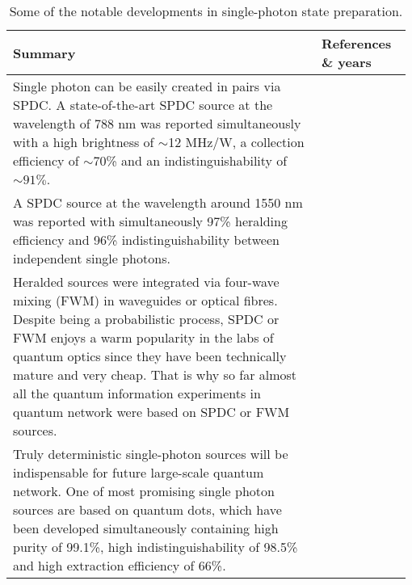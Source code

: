 \begin{table*}[!htbp]
	\begin{tabular}{|p{0.755\linewidth}|p{0.22\linewidth}|}
		\hline
	\textbf{Summary} & \textbf{References \& years} \\	\hline \hline
		Single photon can be easily created in pairs via SPDC. A state-of-the-art SPDC source at the wavelength of 788 nm was reported simultaneously with a high brightness of $\sim$12 MHz/W, a collection efficiency of $\sim$70\% and an indistinguishability of $\sim 91\%$. & \cite{bib:wang2016experimental} \\
		\hline
		A SPDC source at the wavelength around 1550 nm was reported with simultaneously 97\% heralding efficiency and 96\% indistinguishability between independent single photons. & \cite{bib:zhong201812} \\
		\hline
		Heralded sources were integrated via four-wave mixing (FWM) in waveguides or optical fibres. Despite being a probabilistic process, SPDC or FWM enjoys a warm popularity in the labs of quantum optics since they have been technically mature and very cheap. That is why so far almost all the quantum information experiments in quantum network were based on SPDC or FWM sources. & \cite{bib:silverstone2014, bib:spring2017chip, bib:goldschmidt2008, bib:smith2009} \\
		\hline
		Truly deterministic single-photon sources will be indispensable for future large-scale quantum network. One of most promising single photon sources are based on quantum dots, which have been developed simultaneously containing high purity of 99.1\%, high indistinguishability of 98.5\% and high extraction efficiency of 66\%. & \cite{bib:he2013on, bib:wei2014de, bib:ding2016on, bib:somaschi2016, bib:wang2016near, bib:loredo2016} \\
		\hline
	\end{tabular}
	\captionspacetab \caption{Some of the notable developments in single-photon state preparation.} \label{tab:single_photon_state}
\end{table*}

